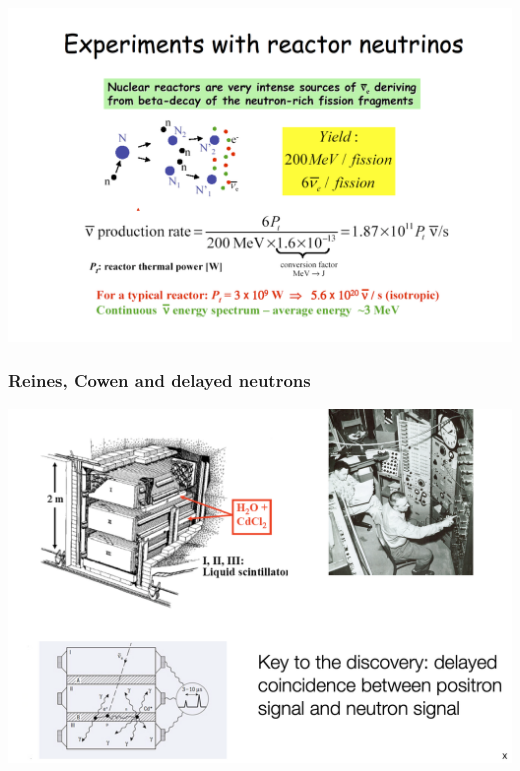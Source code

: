 \begin{frame}

\includegraphics[scale=0.35]{img/ReactorNeutrinos.png}

\end{frame}

\begin{frame}
\frametitle{Reines, Cowen and delayed neutrons}
\includegraphics[scale=0.35]{img/ReinesCowen.png}

\end{frame}

